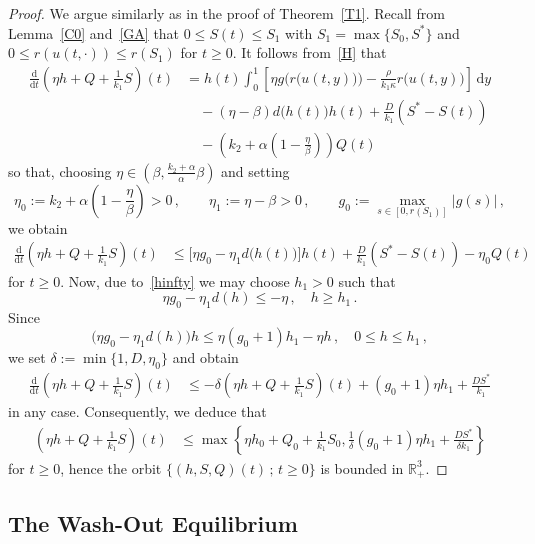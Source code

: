 \documentclass[reqno,11pt]{amsart}
\numberwithin{equation}{section}
\newcommand{\R}{\mathbb{R}}
\newcommand{\rd}{\mathrm{d}}
\begin{document}
\begin{proof}
We argue similarly as in the proof of Theorem~\ref{T1}. Recall from Lemma~\ref{C0} and~\eqref{GA} that  \mbox{$0\le S(t)\le S_1$} with $S_1=\max\{S_0,S^*\}$ and $0\le r(u(t,\cdot))\le r(S_1)$ for $t\ge 0$. It follows from~\eqref{H} that
\begin{align*}
\frac{\rd}{\rd t}\left(\eta h+Q+\frac{1}{k_1}S\right)(t)&=h(t)\int_0^1 \left[\eta g\bigl(r\bigl(u(t,y)\bigr)\bigr)-\frac{\rho }{k_1\kappa }  r\bigl(u(t,y)\bigr)\right]\,\rd y \\
&\quad -(\eta-\beta) d\big(h(t)\big)h(t)+ \frac{D}{k_1}(S^*-S(t))\\
&\quad -\left(k_2+\alpha\left(1-\frac{\eta}{\beta}\right)\right)Q(t)
\end{align*}
so that, choosing $\eta\in\left(\beta,\frac{k_2+\alpha}{\alpha}\beta\right)$ and setting
$$
\eta_0:=k_2+\alpha\left(1-\frac{\eta}{\beta}\right)>0\,,\qquad \eta_1:=\eta-\beta>0\,,\qquad g_0:=\max_{s\in [0,r(S_1)]} \vert g(s)\vert \,,
$$
we obtain
\begin{align*}
\frac{\rd}{\rd t}\left(\eta h+Q+\frac{1}{k_1}S\right)(t)&\le \big[\eta g_0-\eta_1 d\big(h(t)\big)\big] h(t) + \frac{D}{k_1}(S^*-S(t))-\eta_0 Q(t)
\end{align*}
for $t\ge 0$. Now, due to~\eqref{hinfty} we may choose $h_1>0$ such that 
$$
\eta g_0-\eta_1 d(h)\le -\eta\,,\quad h\ge h_1\,.
$$
Since 
$$
\big(\eta g_0-\eta_1 d(h)\big)h\le \eta(g_0+1)h_1-\eta h\,,\quad 0\le h\le h_1\,,
$$
we set $\delta:=\min\{1,D,\eta_0\}$ and obtain
\begin{align*}
\frac{\rd}{\rd t}\left(\eta h+Q+\frac{1}{k_1}S\right)(t)&\le -\delta \left(\eta h+Q+\frac{1}{k_1}S\right)(t) + ( g_0+1)\eta h_1+\frac{DS^*}{k_1}
\end{align*}
in any case. Consequently, we deduce that
\begin{align*}
\left(\eta h+Q+\frac{1}{k_1}S\right)(t)&\le \max\left\{\eta h_0+Q_0+\frac{1}{k_1}S_0,\frac{1}{\delta}( g_0+1)\eta h_1+\frac{DS^*}{\delta k_1}\right\}
\end{align*}
for $t\ge 0$, hence
the  orbit $\{(h,S,Q)(t)\,;\, t\ge 0\}$ is bounded in $\R_+^3$.
\end{proof}




\subsection{The Wash-Out Equilibrium}\label{Sec3a}
\end{document}
